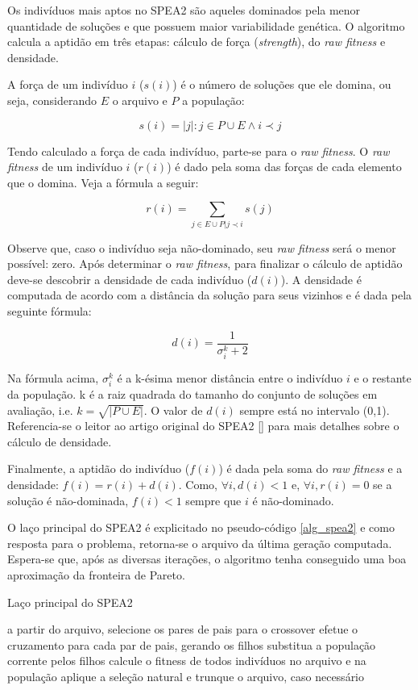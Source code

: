 Os indivíduos mais aptos no SPEA2 são aqueles dominados pela menor quantidade de soluções e que possuem maior variabilidade genética. O algoritmo calcula a aptidão em três etapas: cálculo de força (\textit{strength}), do \textit{raw fitness} e densidade.

A força de um indivíduo $i$ ($s(i)$) é o número de soluções que ele domina, ou seja, considerando $E$ o arquivo e $P$ a população:

\[ s(i) = |j|: j \in P \cup E \land i \prec j \]

Tendo calculado a força de cada indivíduo, parte-se para o \textit{raw fitness}. O \textit{raw fitness} de um indivíduo $i$ ($r(i)$) é dado pela soma das forças de cada elemento que o domina. Veja a fórmula a seguir:

\[ r(i) = \sum_{j \in E \cup P | j \prec i} s(j) \]

Observe que, caso o indivíduo seja não-dominado, seu \textit{raw fitness} será o menor possível: zero. Após determinar o \textit{raw fitness}, para finalizar o cálculo de aptidão deve-se descobrir a densidade de cada indivíduo ($d(i)$). A densidade é computada de acordo com a distância da solução para seus vizinhos e é dada pela seguinte fórmula:

\[ d(i) = \frac{1}{\sigma_i^k + 2} \]

Na fórmula acima, $\sigma_i^k$ é a k-ésima menor distância entre o indivíduo $i$ e o restante da população. k é a raiz quadrada do tamanho do conjunto de soluções em avaliação, i.e. $k = \sqrt{|P \cup E|}$. O valor de $d(i)$ sempre está no intervalo (0,1). Referencia-se o leitor ao artigo original do SPEA2 [] para mais detalhes sobre o cálculo de densidade.

Finalmente, a aptidão do indivíduo ($f(i)$) é dada pela soma do \textit{raw fitness} e a densidade: $f(i) = r(i) + d(i)$. Como, $\forall i, d(i) < 1$ e, $\forall i, r(i) = 0$ se a solução é não-dominada, $f(i) < 1$ sempre que $i$ é não-dominado.

O laço principal do SPEA2 é explicitado no pseudo-código \ref{alg_spea2} e como resposta para o problema, retorna-se o arquivo da última geração computada. Espera-se que, após as diversas iterações, o algoritmo tenha conseguido uma boa aproximação da fronteira de Pareto.

\begin{algorithm}
	\caption{Laço principal do SPEA2}
	\label{alg_spea2}
	\begin{algorithmic}[1]
		\State a partir do arquivo, selecione os pares de pais para o crossover
		\State efetue o cruzamento para cada par de pais, gerando os filhos
		\State substitua a população corrente pelos filhos
		\State calcule o fitness de todos indivíduos no arquivo e na população
		\State aplique a seleção natural e trunque o arquivo, caso necessário
		\EndWhile
	\end{algorithmic}
\end{algorithm}

